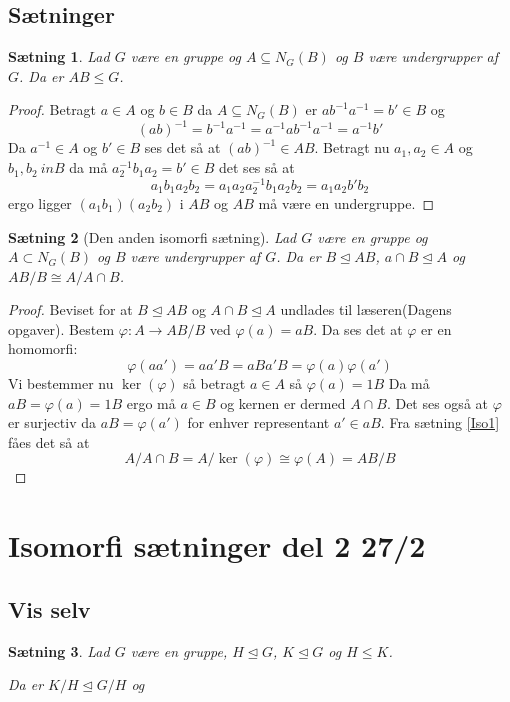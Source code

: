 \documentclass{article}
\newcommand{\inv}{^{-1}}
\newcommand{\too}{\rightarrow}
\newtheorem{setn}{Sætning}
\begin{document}
		\subsection*{Sætninger}
		\begin{setn}
			Lad $G$ være en gruppe og $A \subseteq N_G(B)$ og $B$ være undergrupper af $G$.
			Da er $AB \le G$.
		\end{setn}
		\begin{proof}
			Betragt $a \in A$ og $b \in B$ da $A \subseteq N_G(B)$ er $ab\inv a\inv = b' \in B$ og
			$$(ab)\inv = b\inv a\inv = a\inv a b \inv a \inv = a \inv b'$$
			Da $a\inv \in A$ og $b' \in B$ ses det så at $(ab)\inv \in AB$. Betragt nu
			$a_1, a_2 \in A$ og $b_1, b_2 \ in B$ da må $a_2\inv b_1 a_2 = b' \in B$ det ses så at
			$$a_1b_1a_2b_2 = a_1a_2a_2\inv b_1a_2b_2 = a_1a_2b'b_2$$
			ergo ligger $(a_1b_1)(a_2b_2)$ i $AB$ og $AB$ må være en undergruppe.
		\end{proof}
		\begin{setn}[Den anden isomorfi sætning]
			Lad $G$ være en gruppe og $A \subset N_G(B)$ og $B$ være undergrupper af $G$.
			Da er $B \unlhd AB$, $a\cap B \unlhd A$ og $AB/B \cong A/A\cap B$.
		\end{setn}
		\begin{proof}
			Beviset for at $B \unlhd AB$ og $A\cap B \unlhd A$ undlades til læseren(Dagens opgaver).
			Bestem $\varphi: A \too AB/B$ ved $\varphi(a) = aB$. Da ses det at $\varphi$ er en
			homomorfi:
			$$\varphi(aa') = aa'B = aBa'B = \varphi(a)\varphi(a')$$
			Vi bestemmer nu $\ker(\varphi)$ så betragt $a \in A$ så $\varphi(a) = 1B$
			Da må $aB = \varphi(a) = 1B$ ergo må $a \in B$ og kernen er dermed $A\cap B$.
			Det ses også at $\varphi$ er surjectiv da $aB = \varphi(a')$ for enhver representant
			$a' \in aB$. Fra sætning \ref{Iso1} fåes det så at
			$$A/A\cap B = A/\ker(\varphi) \cong \varphi(A) = AB/B$$
		\end{proof}
	\newpage
	\section*{Isomorfi sætninger del 2 27/2}
		\subsection*{Vis selv}
		\begin{setn}
			Lad $G$ være en gruppe, $H \unlhd G$, $K \unlhd G$ og $H \le K$.

			Da er $K/H \unlhd G/H$ og
		\end{setn}
\end{document}
